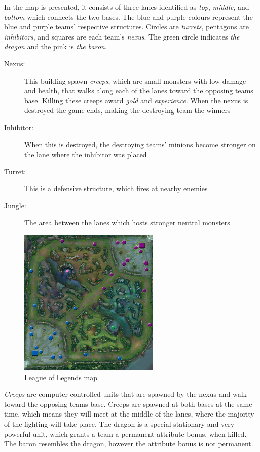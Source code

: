 In  the map is presented, it consists of three lanes identified as \emph{top}, \emph{middle}, and \emph{bottom} which connects the two bases. The blue and purple colours represent the blue and purple teams' respective structures. Circles are \emph{turrets}, pentagons are \emph{inhibitors}, and squares are each team's \emph{nexus}. The green circle indicates \emph{the dragon} and the pink is \emph{the baron}.

\begin{description}
\item[Nexus:] This building spawn \emph{creeps}, which are small monsters with low damage and health, that walks along each of the lanes toward the opposing teams base. Killing these creeps award \emph{gold} and \emph{experience}. When the nexus is destroyed the game ends, making the destroying team the winners
\item[Inhibitor:] When this is destroyed, the destroying teams' minions become stronger on the lane where the inhibitor was placed
\item[Turret:] This is a defensive structure, which fires at nearby enemies
\item[Jungle:] The area between the lanes which hosts stronger neutral monsters
\end{description}

\begin{figure}[!htb]
  \centering
    \includegraphics[width=0.6\textwidth]{img/lolmap.jpg}
  \caption{League of Legends map~\cite{lolmap}}\label{fig:lolmap}
\end{figure}

\emph{Creeps} are computer controlled units that are spawned by the nexus and walk toward the opposing teams base. Creeps are spawned at both bases at the same time, which means they will meet at the middle of the lanes, where the majority of the fighting will take place. The dragon is a special stationary and very powerful unit, which grants a team a permanent attribute bonus, when killed. The baron resembles the dragon, however the attribute bonus is not permanent.

